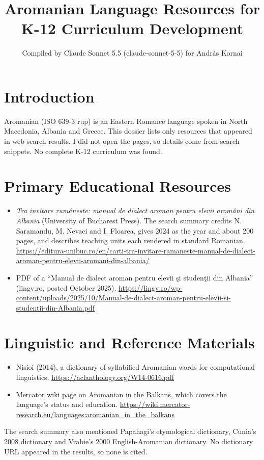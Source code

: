 \documentclass[12pt]{article}
\title{Aromanian Language Resources for K-12 Curriculum Development}
\author{Compiled by Claude Sonnet 5.5 (claude-sonnet-5-5) for Andr\'as Kornai}
\date{}
\begin{document}
\maketitle
\section{Introduction}
Aromanian (ISO 639-3 rup) is an Eastern Romance language spoken in North Macedonia, Albania and Greece. This dossier lists only resources that appeared in web search results. I did not open the pages, so details come from search snippets. No complete K-12 curriculum was found.

\section{Primary Educational Resources}
\begin{itemize}
\item \emph{Tra invitare rum\^aneste: manual de dialect aroman pentru elevii arom\^ani din Albania} (University of Bucharest Press). The search summary credits N. Saramandu, M. Nevaci and I. Floarea, gives 2024 as the year and about 200 pages, and describes teaching units each rendered in standard Romanian. \url{https://editura-unibuc.ro/en/carti-tra-invitare-ramaneste-manual-de-dialect-aroman-pentru-elevii-aromani-din-albania/}
\item PDF of a ``Manual de dialect aroman pentru elevii \c{s}i studen\c{t}ii din Albania'' (lingv.ro, posted October 2025). \url{https://lingv.ro/wp-content/uploads/2025/10/Manual-de-dialect-aroman-pentru-elevii-si-studentii-din-Albania.pdf}
\end{itemize}

\section{Linguistic and Reference Materials}
\begin{itemize}
\item Nisioi (2014), a dictionary of syllabified Aromanian words for computational linguistics. \url{https://aclanthology.org/W14-0616.pdf}
\item Mercator wiki page on Aromanian in the Balkans, which covers the language's status and education. \url{https://wiki.mercator-research.eu/languages:aromanian_in_the_balkans}
\end{itemize}
The search summary also mentioned Papahagi's etymological dictionary, Cunia's 2008 dictionary and Vrabie's 2000 English-Aromanian dictionary. No dictionary URL appeared in the results, so none is cited.
\end{document}
